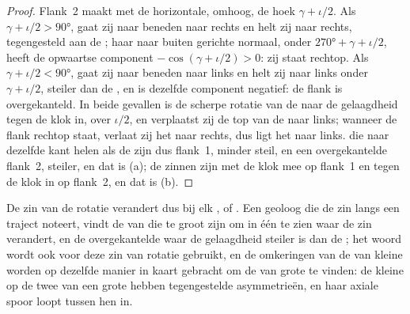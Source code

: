 \begin{proof}
Flank~2 maakt met de horizontale, omhoog, de hoek $\gamma + \iota/2$. Als $\gamma + \iota/2 > \ang{90}$, gaat zij naar beneden naar rechts en helt zij naar rechts, tegengesteld aan de ; haar naar buiten gerichte normaal, onder $\ang{270} + \gamma +
\iota/2$, heeft de opwaartse component $-\cos(\gamma + \iota/2) > 0$: zij staat rechtop. Als $\gamma + \iota/2 < \ang{90}$, gaat zij naar beneden naar links en helt zij naar links onder $\gamma + \iota/2$, steiler dan de , en is dezelfde component negatief: de flank is overgekanteld. In beide gevallen is de scherpe rotatie van de  naar de gelaagdheid tegen de klok in, over $\iota/2$, en verplaatst zij de top van de  naar links; wanneer de flank rechtop staat, verlaat zij het  naar rechts, dus ligt het  naar links.  die naar dezelfde kant helen als de  zijn dus flank~1, minder steil, en een overgekantelde flank~2, steiler, en dat is (a); de zinnen zijn met de klok mee op flank~1 en tegen de klok in op flank~2, en dat is (b).
\end{proof}

De zin van de rotatie verandert dus bij elk ,  of .
Een geoloog die de zin langs een traject noteert, vindt de  van  die te groot zijn om in één  te zien waar de zin verandert, en de overgekantelde  waar de gelaagdheid steiler is dan de ; het woord  wordt ook voor deze zin van rotatie gebruikt, en de omkeringen van de  van kleine  worden op dezelfde manier in kaart gebracht om de  van grote  te vinden: de kleine  op de twee  van een grote hebben tegengestelde asymmetrieën, en haar axiale spoor loopt tussen hen in.

